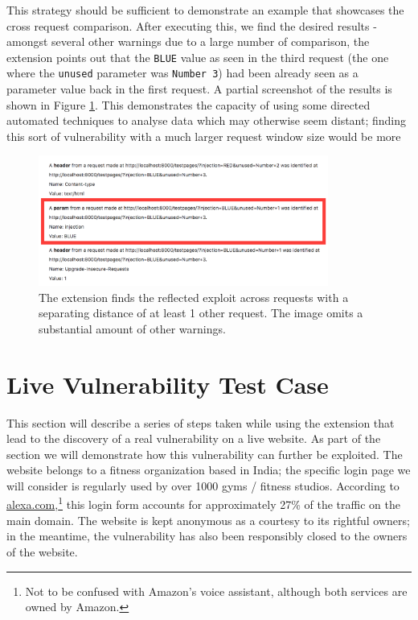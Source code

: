 This strategy should be sufficient to demonstrate an example that showcases the cross request comparison. After executing this, we find the desired results - amongst several other warnings due to a large number of comparison, the extension points out that the \texttt{BLUE} value as seen in the third request (the one where the \texttt{unused} parameter was \texttt{Number 3}) had been already seen as a parameter value back in the first request. A partial screenshot of the results is shown in Figure \ref{fig:cross_check_warnings}. This demonstrates the capacity of using some directed automated techniques to analyse data which may otherwise seem distant; finding this sort of vulnerability with a much larger request window size would be more 

\begin{figure}[h!]
	\centering
	\includegraphics[width=0.85\textwidth]{images/cross_request_warnings.png}
	\caption{The extension finds the reflected exploit across requests with a separating distance of at least 1 other request. The image omits a substantial amount of other warnings.}
	\label{fig:cross_check_warnings}
\end{figure}


\section{Live Vulnerability Test Case} \label{live_vulnerability}

This section will describe a series of steps taken while using the extension that lead to the discovery of a real vulnerability on a live website. As part of the section we will demonstrate how this vulnerability can further be exploited. The website belongs to a fitness organization based in India; the specific login page we will consider is regularly used by over 1000 gyms / fitness studios. According to \url{alexa.com},\footnote{Not to be confused with Amazon's voice assistant, although both services are owned by Amazon.} this login form accounts for approximately 27\% of the traffic on the main domain. The website is kept anonymous as a courtesy to its rightful owners; in the meantime, the vulnerability has also been responsibly closed to the owners of the website. \\ 

